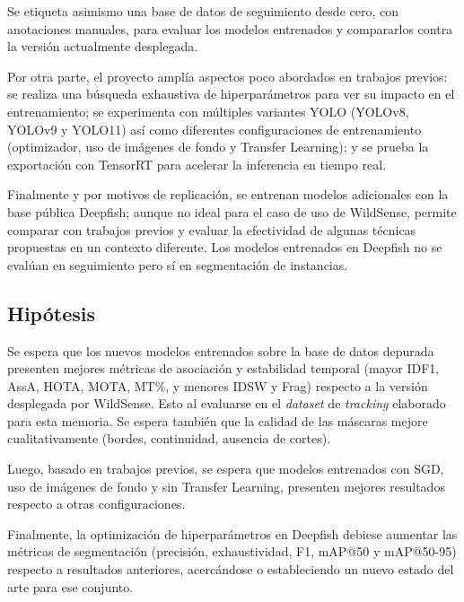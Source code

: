 Se etiqueta asimismo una base de datos de seguimiento desde cero, con anotaciones manuales, para evaluar los modelos entrenados y compararlos contra la versión actualmente desplegada.

Por otra parte, el proyecto amplía aspectos poco abordados en trabajos previos: se realiza una búsqueda exhaustiva de hiperparámetros para ver su impacto en el entrenamiento; se experimenta con múltiples variantes YOLO (YOLOv8, YOLOv9 y YOLO11) así como diferentes configuraciones de entrenamiento (optimizador, uso de imágenes de fondo y Transfer Learning); y se prueba la exportación con TensorRT para acelerar la inferencia en tiempo real.

Finalmente y por motivos de replicación, se entrenan modelos adicionales con la base pública Deepfish; aunque no ideal para el caso de uso de WildSense, permite comparar con trabajos previos y evaluar la efectividad de algunas técnicas propuestas en un contexto diferente. Los modelos entrenados en Deepfish no se evalúan en seguimiento pero sí en segmentación de instancias.

\subsection{Hipótesis}
Se espera que los nuevos modelos entrenados sobre la base de datos depurada presenten mejores métricas de asociación y estabilidad temporal (mayor IDF1, AssA, HOTA, MOTA, MT\%, y menores IDSW y Frag) respecto a la versión desplegada por WildSense. Esto al evaluarse en el \textit{dataset} de \textit{tracking} elaborado para esta memoria. Se espera también que la calidad de las máscaras mejore cualitativamente (bordes, continuidad, ausencia de cortes).%

Luego, basado en trabajos previos, se espera que modelos entrenados con SGD, uso de imágenes de fondo y sin Transfer Learning, presenten mejores resultados respecto a otras configuraciones.

Finalmente, la optimización de hiperparámetros en Deepfish debiese aumentar las métricas de segmentación (precisión, exhaustividad, F1, mAP@50 y mAP@50-95) respecto a resultados anteriores, acercándose o estableciendo un nuevo estado del arte para ese conjunto.


